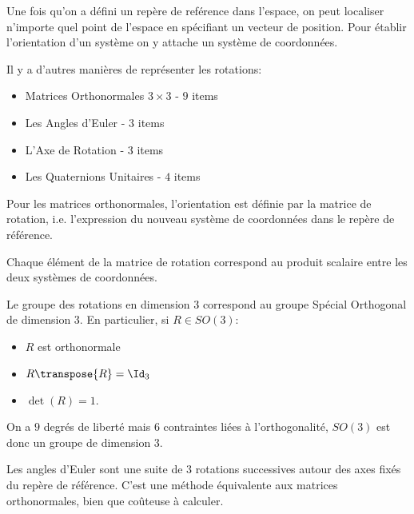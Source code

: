 \documentclass[math]{cours}
\begin{document}
\begin{definition}
Une fois qu'on a défini un repère de reférence dans l'espace, on peut localiser n'importe quel point de l'espace en spécifiant un vecteur de position.
Pour établir l'orientation d'un système on y attache un système de coordonnées.
\end{definition}

Il y a d'autres manières de représenter les rotations:
\begin{itemize}
	\item Matrices Orthonormales $3\times 3$ - $9$ items
	\item Les Angles d'Euler - $3$ items
	\item L'Axe de Rotation - $3$ items
	\item Les Quaternions Unitaires - $4$ items
\end{itemize}

\begin{definition}
	Pour les matrices orthonormales, l'orientation est définie par la matrice de rotation, i.e. l'expression du nouveau système de coordonnées dans le repère de référence.
	\label{def:rotationmatrix}
\end{definition}

\begin{proposition}
Chaque élément de la matrice de rotation correspond au produit scalaire entre les deux systèmes de coordonnées.
\end{proposition}
\begin{proposition}
Le groupe des rotations en dimension $3$ correspond au groupe Spécial Orthogonal de dimension $3$.
En particulier, si $R \in SO(3)$:
\begin{itemize}
	\item $R$ est orthonormale
	\item $R\transpose{R} = \Id_{3}$
	\item $\det(R) = 1$.
\end{itemize}
On a $9$ degrés de liberté mais $6$ contraintes liées à l'orthogonalité, $SO(3)$ est donc un groupe de dimension $3$.
\end{proposition}

\begin{definition}
	Les angles d'Euler sont une suite de $3$ rotations successives autour des axes fixés du repère de référence.
	C'est une méthode équivalente aux matrices orthonormales, bien que coûteuse à calculer.
	\label{def:eulerangles}
\end{definition}
\end{document}
